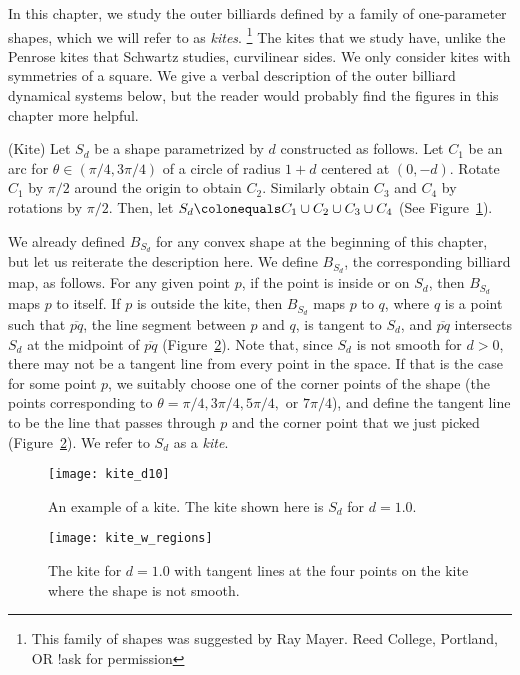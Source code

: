 \documentclass[12pt,twoside]{book}
\begin{document}
In this chapter, we study the outer billiards defined by a family of one-parameter shapes, which we will refer to as \textit{kites}.
\footnote{This family of shapes was suggested by Ray Mayer. Reed College, Portland, OR !ask for permission}
The kites that we study have, unlike the Penrose kites that Schwartz studies, curvilinear sides.
We only consider kites with symmetries of a square.
We give a verbal description of the outer billiard dynamical systems below, but the reader would probably find the figures in this chapter more helpful.
\begin{definition}
  (Kite)
  Let $S_d$ be a shape parametrized by $d$ constructed as follows.
  Let $C_1$ be an arc for $\theta \in (\pi/4, 3\pi/4)$ of a circle of radius $1+d$ centered at $(0,-d)$.
  Rotate $C_1$ by $\pi/2$ around the origin to obtain $C_2$.
  Similarly obtain $C_3$ and $C_4$ by rotations by $\pi/2$.
  Then, let $S_d \ceq C_1 \cup C_2 \cup C_3 \cup C_4$ (See Figure~\ref{fig:kiteeg}).

  We already defined $B_{S_d}$ for any convex shape at the beginning of this chapter, but let us reiterate the description here.
  We define $B_{S_d}$, the corresponding billiard map, as follows.
  For any given point $p$, if the point is inside or on $S_d$, then $B_{S_d}$ maps $p$ to itself.
  If $p$ is outside the kite, then $B_{S_d}$ maps $p$ to $q$, where $q$ is a point such that $\overline{pq}$, the line segment between $p$ and $q$, is tangent to $S_d$, and $\overline{pq}$ intersects $S_d$ at the midpoint of $\overline{pq}$ (Figure~\ref{fig:kite-regions}).
  Note that, since $S_d$ is not smooth for $d > 0$, there may not be a tangent line from every point in the space.
  If that is the case for some point $p$, we suitably choose one of the corner points of the shape (the points corresponding to $\theta = \pi/4, 3\pi/4, 5\pi/4, \mbox{ or } 7\pi/4$), and define the tangent line to be the line that passes through $p$ and the corner point that we just picked (Figure~\ref{fig:kite-regions}).
  We refer to $S_d$ as a \textit{kite}.

\end{definition}
\begin{figure}[ht]
  \begin{center}
    \texttt{[image: kite\_d10]}
    \caption{An example of a kite. The kite shown here is $S_d$ for $d = 1.0$.}
    \label{fig:kiteeg}
  \end{center}
\end{figure}
\begin{figure}[ht]
  \begin{center}
    \texttt{[image: kite\_w\_regions]}
    \caption{The kite for $d = 1.0$ with tangent lines at the four points on the kite where the shape is not smooth.}
    \label{fig:kite-regions}
  \end{center}
\end{figure}
\end{document}
